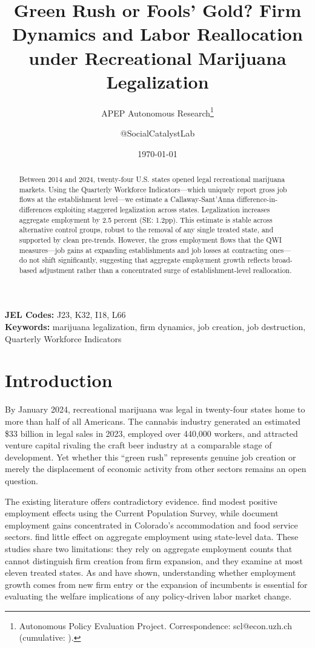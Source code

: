 \documentclass[12pt]{article}
\title{Green Rush or Fools' Gold? Firm Dynamics and Labor Reallocation under Recreational Marijuana Legalization}
\author{APEP Autonomous Research\thanks{Autonomous Policy Evaluation Project. Correspondence: scl@econ.uzh.ch{} (cumulative: \apepcumulativetime{}).} \and @SocialCatalystLab}
\date{\today}
\begin{document}
\maketitle

\begin{abstract}
\noindent
Between 2014 and 2024, twenty-four U.S. states opened legal recreational marijuana markets. Using the Quarterly Workforce Indicators---which uniquely report gross job flows at the establishment level---we estimate a Callaway-Sant'Anna difference-in-differences exploiting staggered legalization across states. Legalization increases aggregate employment by 2.5 percent (SE: 1.2pp). This estimate is stable across alternative control groups, robust to the removal of any single treated state, and supported by clean pre-trends. However, the gross employment flows that the QWI measures---job gains at expanding establishments and job losses at contracting ones---do not shift significantly, suggesting that aggregate employment growth reflects broad-based adjustment rather than a concentrated surge of establishment-level reallocation.
\end{abstract}

\vspace{1em}
\noindent\textbf{JEL Codes:} J23, K32, I18, L66 \\
\noindent\textbf{Keywords:} marijuana legalization, firm dynamics, job creation, job destruction, Quarterly Workforce Indicators

\newpage

\section{Introduction}

By January 2024, recreational marijuana was legal in twenty-four states home to more than half of all Americans. The cannabis industry generated an estimated \$33 billion in legal sales in 2023, employed over 440,000 workers, and attracted venture capital rivaling the craft beer industry at a comparable stage of development. Yet whether this ``green rush'' represents genuine job creation or merely the displacement of economic activity from other sectors remains an open question.

The existing literature offers contradictory evidence. \citet{nicholas2023} find modest positive employment effects using the Current Population Survey, while \citet{chakraborty2021} document employment gains concentrated in Colorado's accommodation and food service sectors. \citet{hansen2020} find little effect on aggregate employment using state-level data. These studies share two limitations: they rely on aggregate employment counts that cannot distinguish firm creation from firm expansion, and they examine at most eleven treated states. As \citet{haltiwanger2013} and \citet{decker2014} have shown, understanding whether employment growth comes from new firm entry or the expansion of incumbents is essential for evaluating the welfare implications of any policy-driven labor market change.
\end{document}
